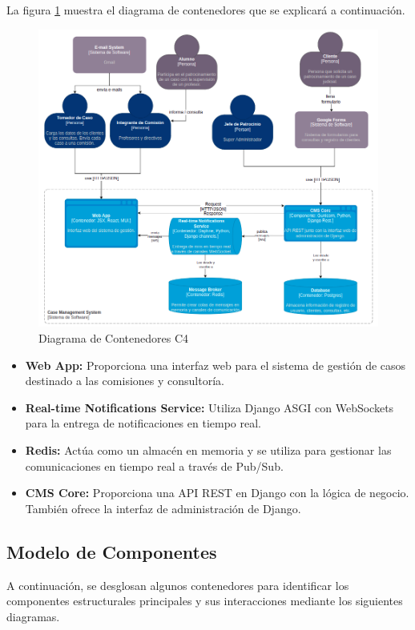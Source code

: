 La figura \ref{fig:c4-02} muestra el diagrama de contenedores que se explicará a continuación.

\begin{figure}[h]
\centering
\includegraphics[width=1\linewidth]{fig/c4-2.png}
\caption{Diagrama de Contenedores C4}
\label{fig:c4-02}
\end{figure}

\begin{itemize}
\item \textbf{Web App:} Proporciona una interfaz web para el sistema de gestión de casos destinado a las comisiones y consultoría.
\item \textbf{Real-time Notifications Service:} Utiliza Django ASGI con WebSockets para la entrega de notificaciones en tiempo real.
\item \textbf{Redis:} Actúa como un almacén en memoria y se utiliza para gestionar las comunicaciones en tiempo real a través de Pub/Sub.
\item \textbf{CMS Core:} Proporciona una API REST en Django con la lógica de negocio. También ofrece la interfaz de administración de Django.
\end{itemize}




\subsection{Modelo de Componentes}
A continuación, se desglosan algunos contenedores para identificar los componentes estructurales principales y sus interacciones mediante los siguientes diagramas.

